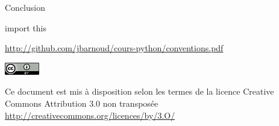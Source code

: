 \documentclass[xcolor=pdftex,dvipsnames,table,handout]{beamer}
\begin{document}
\begin{frame}{Conclusion}
\begin{center}
    \Huge{import this}
\end{center}
\end{frame}

\begin{frame}[plain]
\vfill
\begin{center}
{\Large%
\url{http://github.com/jbarnoud/cours-python/conventions.pdf}%
}
\vfill
\vfill
\vfill
{\tiny%
\includegraphics[width=1.5cm]{img/logo/cc_by}

Ce document est mis à disposition selon les termes de la licence Creative Commons Attribution 3.0 non transposée\newline
\url{http://creativecommons.org/licences/by/3.O/}
}
\end{center}
\end{frame}
\end{document}
